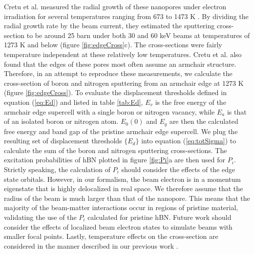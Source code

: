 \documentclass{article}
\begin{document}
Cretu et al. measured the radial growth of these nanopores under electron
irradiation for several temperatures ranging from 673 to 1473 K
\cite{Cretu2015}.
By dividing the radial growth rate by the beam current, they estimated the
sputtering cross-section to be around 25 barn under both 30 and 60 keV beams at
temperatures of 1273 K and below (figure \ref{fig:edgeCross}c).
The cross-sections were fairly temperature independent at these relatively low
temperatures.
Cretu et al. also found that the edges of these pores most often assume an
armchair structure.
Therefore, in an attempt to reproduce these measurements, we calculate the
cross-section of boron and nitrogen sputtering from an armchair edge at 1273 K
(figure \ref{fig:edgeCross}).
To evaluate the displacement thresholds defined in equation (\ref{eq:Ed}) and
listed in table \ref{tab:Ed}, $E_v$ is the free energy of the armchair edge
supercell with a single boron or nitrogen vacancy, while $E_a$ is that of an
isolated boron or nitrogen atom.
$E_0(0)$ and $E_g$ are then the calculated free energy and band gap of the
pristine armchair edge supercell.
We plug the resulting set of displacement thresholds $\{E_d\}$ into equation
(\ref{eq:totSigma}) to calculate the sum of the boron and nitrogen sputtering
cross-sections.
The excitation probabilities of hBN plotted in figure \ref{fig:Pi}a are
then used for $P_i$.
Strictly speaking, the calculation of $P_i$ should consider the effects of the
edge state orbitals.
However, in our formalism, the beam electron is in a momentum eigenstate that
is highly delocalized in real space.
We therefore assume that the radius of the beam is much larger than that of the
nanopore.
This means that the majority of the beam-matter interactions occur in regions
of pristine material, validating the use of the $P_i$ calculated for pristine
hBN.
Future work should consider the effects of localized beam electron states to
simulate beams with smaller focal points.
Lastly, temperature effects on the cross-section are considered in the manner
described in our previous work \cite{Yoshimura2018}.
\end{document}
